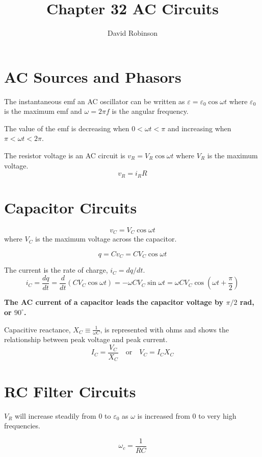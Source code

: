 \documentclass{article}
\title{Chapter 32 AC Circuits}
\author{David Robinson}
\date{}
\begin{document}
\maketitle

\section*{AC Sources and Phasors}

The instantaneous emf an AC oscillator can be written as $\varepsilon = \varepsilon_0\cos\omega t$
where $\varepsilon_0$ is the maximum emf and $\omega = 2\pi f$ is the angular frequency.
\vspace{1em}

The value of the emf is decreasing when $0 < \omega t < \pi$ and increasing when
$\pi < \omega t < 2\pi$.
\vspace{1em}

The resistor voltage is an AC circuit is $v_R = V_R\cos\omega t$ where $V_R$ is the maximum
voltage.
\[v_R=i_R R\]

\section*{Capacitor Circuits}
\[v_C = V_C \cos\omega t\] where $V_C$ is the maximum voltage across the capacitor.

\[q=Cv_C = CV_C \cos\omega t\]

The current is the rate of charge, $i_C = dq/dt$.
\[i_C=\frac{dq}{dt}=\frac{d}{dt}(CV_C\cos\omega t) = -\omega CV_C \sin\omega t=\omega CV_C\cos
(\omega t + \frac{\pi}{2})\]

\textbf{The AC current of a capacitor leads the capacitor voltage by $\pi / 2$ rad, or $90^\circ$.}
\vspace{1em}

Capacitive reactance, $X_C\equiv \frac{1}{\omega C}$, is represented with ohms and shows the
relationship between peak voltage and peak current.
\[I_C = \frac{V_C}{X_C}\quad\text{or}\quad V_C=I_C X_C\]

\pagebreak

\section*{RC Filter Circuits}

$V_R$ will increase steadily from $0$ to $\varepsilon_0$ as $\omega$ is increased from $0$ to very
high frequencies.

\[\omega_c = \frac{1}{RC}\]
\end{document}
